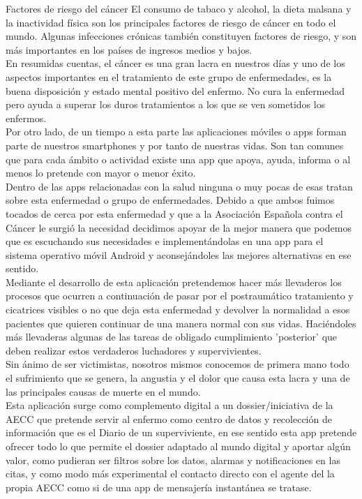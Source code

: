 \documentclass[../pfc.tex]{subfiles}
\begin{document}
Factores de riesgo del cáncer
El consumo de tabaco y alcohol, la dieta malsana y la inactividad física son los principales factores de riesgo de cáncer en todo el mundo. Algunas infecciones crónicas también constituyen factores de riesgo, y son más importantes en los países de ingresos medios y bajos.\\

En resumidas cuentas, el cáncer es una gran lacra en nuestros días \cite{OMS} y uno de los aspectos importantes en el tratamiento de este grupo de enfermedades, es la buena disposición y estado mental positivo del enfermo. No cura la enfermedad pero ayuda a superar los duros tratamientos a los que se ven sometidos los enfermos.\\

Por otro lado, de un tiempo a esta parte las aplicaciones móviles o apps forman parte de nuestros smartphones y por tanto de nuestras vidas. Son tan comunes que para cada ámbito o actividad existe una app que apoya, ayuda, informa o al menos lo pretende con mayor o menor éxito.\\

Dentro de las apps relacionadas con la salud ninguna o muy pocas de esas tratan sobre esta enfermedad o grupo de enfermedades. Debido a que ambos fuimos tocados de cerca por esta enfermedad y que a la Asociación Española contra el Cáncer le surgió la necesidad decidimos apoyar de la mejor manera que podemos que es escuchando sus necesidades e implementándolas en una app para el sistema operativo móvil Android y aconsejándoles las mejores alternativas en ese sentido. \\

Mediante el desarrollo de esta aplicación pretendemos hacer más llevaderos los procesos que ocurren a continuación de pasar por el postraumático tratamiento y cicatrices visibles o no que deja esta enfermedad y devolver la normalidad a esos pacientes que quieren continuar de una manera normal con sus vidas. Haciéndoles más llevaderas algunas de las tareas de obligado cumplimiento 'posterior' que deben realizar estos verdaderos luchadores y supervivientes.\\
Sin ánimo de ser victimistas, nosotros mismos conocemos de primera mano todo el sufrimiento que se genera, la angustia y el dolor que causa esta lacra y una de las principales causas de muerte en el mundo.\\

Esta aplicación surge como complemento digital a un dossier/iniciativa de la AECC que pretende servir al enfermo como centro de datos y recolección de información que es el  Diario de un superviviente, en ese sentido esta app pretende ofrecer todo lo que permite el dossier adaptado al mundo digital y aportar algún valor, como pudieran ser filtros sobre los datos, alarmas y notificaciones en las citas, y como modo más experimental el contacto directo con el agente del la propia AECC como si de una app de mensajería instantánea se tratase. \\
\end{document}
